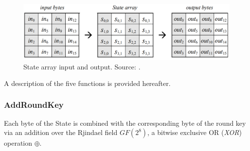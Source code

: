 \begin{figure}
\includegraphics[width = \textwidth]{../Figures/FISP_AES/state.png} 
\caption[State array input and output.]{State array input and output. Source: \cite{nist197}.}\label{fig:AES_state}
\end{figure}

A description of the five functions is provided hereafter.


\subsubsection*{AddRoundKey} Each byte of the State is combined with the corresponding byte of the round key via an addition over the Rjindael field $GF(2^8)$, \ie a bitwise exclusive OR (\emph{XOR}) operation $\oplus$.
